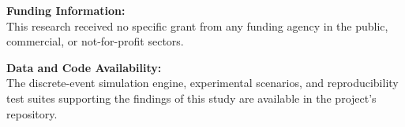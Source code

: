 \documentclass[12pt,a4paper]{article}
\begin{document}
\vspace{1.5em}

\noindent\textbf{Funding Information:}\\
This research received no specific grant from any funding agency in the public, commercial, or not-for-profit sectors.

\vspace{1.5em}

\noindent\textbf{Data and Code Availability:}\\
The discrete-event simulation engine, experimental scenarios, and reproducibility test suites supporting the findings of this study are available in the project's repository.
\end{document}
